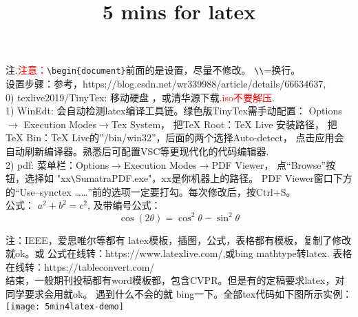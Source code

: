 \documentclass[UTF8]{article}%
\title{5 mins for latex }
\begin{document}
\maketitle          %
注.\textcolor{red}{注意：}\verb|\begin{document}|前面的是设置，尽量不修改。
\verb|\\|=换行。\\
设置步骤：参考，https://blog.csdn.net/wr339988/article/details/66634637,\\
0) texlive2019/TinyTex: 移动硬盘 ，或清华源下载.\textcolor{red}{iso不要解压}.\\
1) WinEdt: 会自动检测latex编译工具链。绿色版TinyTex需手动配置：
Options $\rightarrow$ Execution Modes$\rightarrow$Tex System，
把TeX Root：TeX Live 安装路径，
把TeX Bin：TeX Live的”/bin/win32”，后面的两个选择Auto-detect，
点击应用会自动刷新编译器。熟悉后可配置VSC等更现代化的代码编辑器.\\
2) pdf: 菜单栏：Options$\rightarrow$Execution Modes$\rightarrow$PDF Viewer，
点“Browse”按钮，选择如 "xx\verb|\|SumatraPDF.exe"，xx是你机器上的路径。
PDF Viewer窗口下方的“Use--synctex ……”前的选项一定要打勾。每次修改后，按Ctrl+S。\\

公式： $a^2+b^2=c^2$, 及带编号公式：
\begin{equation}
\cos(2 \theta) = \cos ^ 2 \theta - \sin ^ 2 \theta
\end{equation}

注：IEEE，爱思唯尔等都有 latex模板，插图，公式，表格都有模板，复制了修改就ok。或
公式在线转：https://www.latexlive.com/,或bing mathtype转latex.
表格在线转：https://tableconvert.com/ \\

结束，一般期刊投稿都有word模板都，包含CVPR。但是有的定稿要求latex，对同学要求会用就ok。
遇到什么不会的就 bing一下。全部tex代码如下图所示实例：\\
\texttt{[image: 5min4latex-demo]}%
\end{document}
